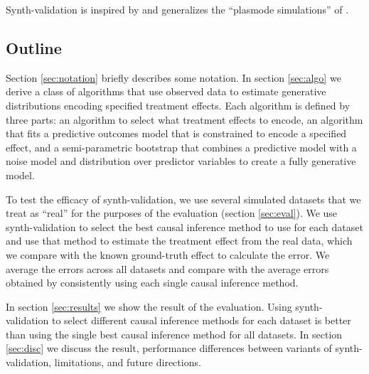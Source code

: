 Synth-validation is inspired by and generalizes the ``plasmode simulations'' of  \citet{Franklin:2014kz}.

\subsection{Outline}

Section \ref{sec:notation} briefly describes some notation. In section \ref{sec:algo} we derive a class of algorithms that use observed data to estimate generative distributions encoding specified treatment effects. Each algorithm is defined by three parts: an algorithm to select what treatment effects to encode, an algorithm that fits a predictive outcomes model that is constrained to encode a specified effect, and a semi-parametric bootstrap that combines a predictive model with a noise model and distribution over predictor variables to create a fully generative model.

To test the efficacy of synth-validation, we use several simulated datasets that we treat as ``real'' for the purposes of the evaluation (section \ref{sec:eval}). We use synth-validation to select the best causal inference method to use for each dataset and use that method to estimate the treatment effect from the real data, which we compare with the known ground-truth effect to calculate the error. We average the errors across all datasets and compare with the average errors obtained by consistently using each single causal inference method.

In section \ref{sec:results} we show the result of the evaluation. Using synth-validation to select different causal inference methods for each dataset is better than using the single best causal inference method for all datasets. In section \ref{sec:disc} we discuss the result, performance differences between variants of synth-validation, limitations, and future directions.